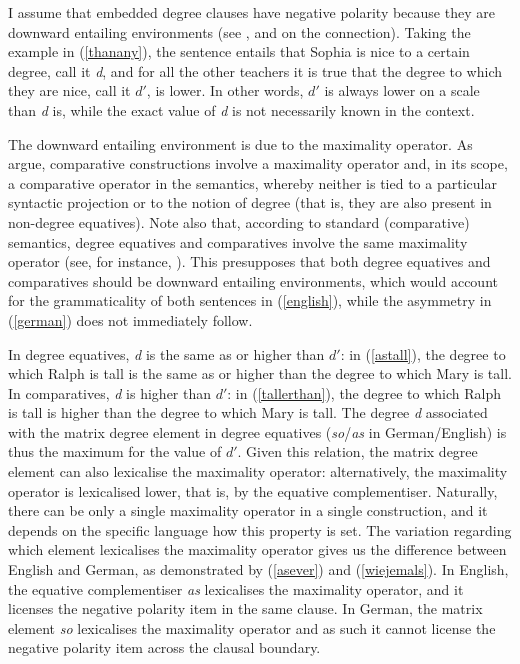I assume that embedded degree clauses have negative polarity because they are downward entailing environments (see \citealt{ladusaw1979diss}, \citealt{vonstechow1984} and \citealt{heim1985, heim2000} on the connection). Taking the example in (\ref{thanany}), the sentence entails that Sophia is nice to a certain degree, call it \textit{d}, and for all the other teachers it is true that the degree to which they are nice, call it $d'$, is lower. In other words, $d'$ is always lower on a scale than \textit{d} is, while the exact value of \textit{d} is not necessarily known in the context. 

The downward entailing environment is due to the maximality operator. As \citet{hohauszimmermann2021} argue, comparative constructions involve a maximality operator and, in its scope, a comparative operator in the semantics, where\-by neither is tied to a particular syntactic projection or to the notion of degree (that is, they are also present in non-degree equatives). Note also that, according to standard (comparative) semantics, degree equatives and comparatives involve the same maximality operator (see, for instance, \citealt{beck2011}). This presupposes that both degree equatives and comparatives should be downward entailing environments, which would account for the grammaticality of both sentences in (\ref{english}), while the asymmetry in (\ref{german}) does not immediately follow. 

In degree equatives, \textit{d} is the same as or higher than $d'$: in (\ref{astall}), the degree to which Ralph is tall is the same as or higher than the degree to which Mary is tall. In comparatives, \textit{d} is higher than $d'$: in (\ref{tallerthan}), the degree to which Ralph is tall is higher than the degree to which Mary is tall. The degree \textit{d} associated with the matrix degree element in degree equatives (\textit{so}/\textit{as} in German/English) is thus the maximum for the value of $d'$. Given this relation, the matrix degree element can also lexicalise the maximality operator: alternatively, the maximality operator is lexicalised lower, that is, by the equative complementiser. Naturally, there can be only a single maximality operator in a single construction, and it depends on the specific language how this property is set. The variation regarding which element lexicalises the maximality operator gives us the difference between English and German, as demonstrated by (\ref{asever}) and (\ref{wiejemals}). In English, the equative complementiser \textit{as} lexicalises the maximality operator, and it licenses the negative polarity item in the same clause. In German, the matrix element \textit{so} lexicalises the maximality operator and as such it cannot license the negative polarity item across the clausal boundary.

